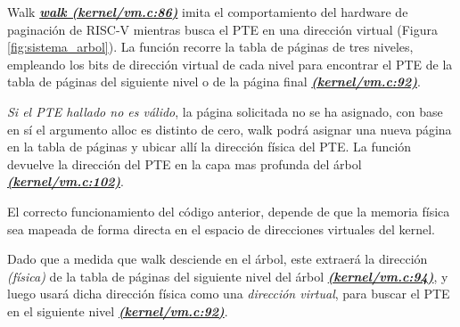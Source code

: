 \documentclass{libs/ufc_format}
\begin{document}
\begin{frame}{Walk}
    \href{https://github.com/CarlosSandoval-03/xv6-riscv/blob/riscv/kernel/vm.c\#L86}{\textbf{\textit{walk (kernel/vm.c:86)}}} imita el comportamiento del hardware de paginación de RISC-V mientras busca el PTE en una dirección virtual (Figura \ref{fig:sistema_arbol}). La función recorre la tabla de páginas de tres niveles, empleando los bits de dirección virtual de cada nivel para encontrar el PTE de la tabla de páginas del siguiente nivel o de la página final \href{https://github.com/CarlosSandoval-03/xv6-riscv/blob/riscv/kernel/vm.c\#L92}{\textbf{\textit{(kernel/vm.c:92)}}}.

    \vspace{0.2cm}
    
    \emph{Si el PTE hallado no es válido}, la página solicitada no se ha asignado, con base en sí el argumento alloc es distinto de cero, walk podrá asignar una nueva página en la tabla de páginas y ubicar allí la dirección física del PTE. La función devuelve la dirección del PTE en la capa mas profunda del árbol \href{https://github.com/CarlosSandoval-03/xv6-riscv/blob/riscv/kernel/vm.c\#L102}{\textbf{\textit{(kernel/vm.c:102)}}}. \cite{xv6_book} \cite{xv6}
\end{frame}
\begin{frame}{}
    El correcto funcionamiento del código anterior, depende de que la memoria física sea mapeada de forma directa en el espacio de direcciones virtuales del kernel.
    
    \vspace{0.2cm}
    
    Dado que a medida que walk desciende en el árbol, este extraerá la dirección \emph{(física)} de la tabla de páginas del siguiente nivel del árbol \href{https://github.com/CarlosSandoval-03/xv6-riscv/blob/riscv/kernel/vm.c\#L94}{\textbf{\textit{(kernel/vm.c:94)}}}, y luego usará dicha dirección física como una \emph{dirección virtual}, para buscar el PTE en el siguiente nivel \href{https://github.com/CarlosSandoval-03/xv6-riscv/blob/riscv/kernel/vm.c\#L92}{\textbf{\textit{(kernel/vm.c:92)}}}. \cite{xv6_book} \cite{xv6}
\end{frame}
\end{document}
